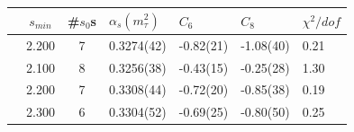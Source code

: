 \documentclass[../../index.tex]{subfiles}
\begin{document}
\begin{table}
  \centering
  \begin{tabularx}{\textwidth}{cccYYYY}
    \toprule
    & \(s_{min}\) & \#\(s_0\)s & \(\alpha_s(m_\tau^2)\) & \(C_6\) & \(C_8\) & \(\chi^2/dof\)  \\
    \midrule
    \parbox[t]{2mm}{}
    & 2.200 & 7 & 0.3274(42) & -0.82(21) & -1.08(40) & 0.21 \\
    \midrule
    \parbox[t]{2mm}{}
    & 2.100 & 8 & 0.3256(38) & -0.43(15) & -0.25(28) & 1.30 \\
    & 2.200 & 7 & 0.3308(44) & -0.72(20) & -0.85(38) & 0.19 \\
    & 2.300 & 6 & 0.3304(52) & -0.69(25) & -0.80(50) & 0.25 \\

\end{tabularx}
\end{table}
\end{document}
